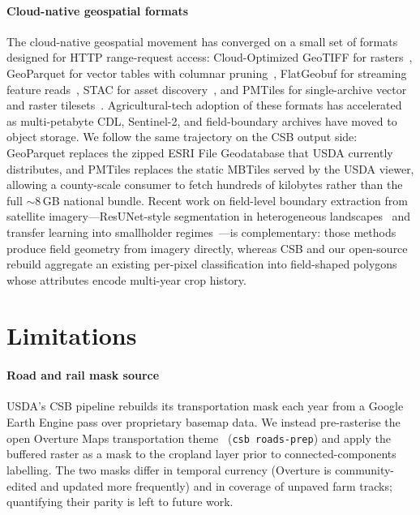 \documentclass[preprint,12pt]{elsarticle}
\begin{document}
\paragraph{Cloud-native geospatial formats}
The cloud-native geospatial movement has converged on a small set of
formats designed for HTTP range-request access: Cloud-Optimized
GeoTIFF for rasters~\cite{ogc_cog}, GeoParquet for vector tables with
columnar pruning~\cite{geoparquet,kelsey2023geoparquet}, FlatGeobuf for
streaming feature reads~\cite{flatgeobuf}, STAC for asset
discovery~\cite{stacspec}, and PMTiles for single-archive vector and
raster tilesets~\cite{pmtiles}. Agricultural-tech adoption of these
formats has accelerated as multi-petabyte CDL, Sentinel-2, and
field-boundary archives have moved to object storage. We follow the
same trajectory on the CSB output side: GeoParquet replaces the zipped
ESRI File Geodatabase that USDA currently distributes, and PMTiles
replaces the static MBTiles served by the USDA viewer, allowing a
county-scale consumer to fetch hundreds of kilobytes rather than the
full $\sim$8\,GB national bundle. Recent work on field-level
boundary extraction from satellite imagery---ResUNet-style segmentation
in heterogeneous landscapes~\cite{waldner2020deepedge} and transfer
learning into smallholder regimes~\cite{wang2022smallholder}---is
complementary: those methods produce field geometry from imagery
directly, whereas CSB and our open-source rebuild aggregate an
existing per-pixel classification into field-shaped polygons whose
attributes encode multi-year crop history.

\section{Limitations}
\label{sec:limits}

\paragraph{Road and rail mask source} USDA's CSB pipeline rebuilds
its transportation mask each year from a Google Earth Engine pass over
proprietary basemap data. We instead pre-rasterise the open Overture
Maps transportation theme~\cite{overture} (\texttt{csb roads-prep}) and
apply the buffered raster as a mask to the cropland layer prior to
connected-components labelling. The two masks differ in temporal
currency (Overture is community-edited and updated more frequently)
and in coverage of unpaved farm tracks; quantifying their parity is
left to future work.
\end{document}
